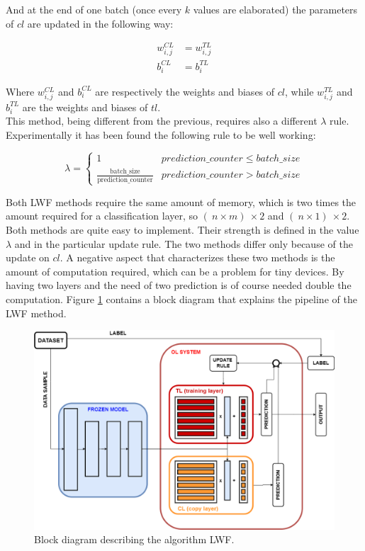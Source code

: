 \documentclass[12pt]{report}
\begin{document}
And at the end of one batch (once every $k$ values are elaborated) the parameters of $cl$ are updated in the following way:

\begin{align}
	w^{CL}_{i,j} &= w^{TL}_{i,j}  \\
	b^{CL}_i     &= b^{TL}_i  
\end{align}

Where $w^{CL}_{i,j}$ and $b^{CL}_i$ are respectively the weights and biases of $cl$, while $w^{TL}_{i,j}$ and $b^{TL}_i$ are the weights and biases of $tl$.\\
This method, being different from the previous, requires also a different $\lambda$ rule. Experimentally it has been found the following rule to be well working:

\begin{equation}
\lambda = \left\{
        		\begin{array}{ll}
            		1                                                         & prediction \_ counter \leq batch \_ size \\
            		\frac{\text{batch$\_$size}}{\text{prediction$\_$counter}} & prediction \_ counter >    batch \_ size
        		\end{array}
    		  \right.
\end{equation}

Both LWF methods require the same amount of memory, which is two times the amount required for a classification layer, so $(\ n \times m )\ \times 2$ and $(\ n \times 1 )\ \times 2$. Both methods are quite easy to implement. Their strength is defined in the value $\lambda$ and in the particular update rule. The two methods differ only because of the update on $cl$. A negative aspect that characterizes these two methods is the amount of computation required, which can be a problem for tiny devices. By having two layers and the need of two prediction is of course needed double the computation. Figure \ref{fig:block_diag_LWF} contains a block diagram that explains the pipeline of the LWF method.

\begin{figure}[h!]
    \centering
    \includegraphics[width=120mm]{Figures/Chapter3/LWF_.png} 
    \caption{Block diagram describing the algorithm LWF.}
    \label{fig:block_diag_LWF}    
\end{figure}
\end{document}
